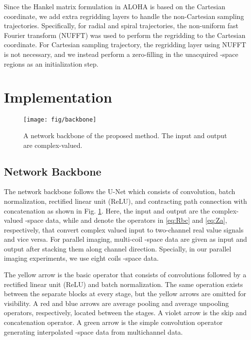 \documentclass[10pt,journal]{IEEEtran}
\newcommand{\0}{{\boldsymbol{0}}}
\begin{document}
Since the Hankel matrix formulation in ALOHA  is based on the Cartesian coordinate, we add extra regridding layers to handle the non-Cartesian sampling trajectories. 
Specifically, for radial and spiral trajectories, the non-uniform fast Fourier transform (NUFFT) was used to perform the regridding to the Cartesian coordinate. 
For Cartesian sampling trajectory, the regridding layer using NUFFT is  not necessary, and
we instead perform a zero-filling in the unacquired -space regions as an initialization step.



\section{Implementation}





\begin{figure}[!t] 	
\centering
{\texttt{[image: fig/backbone]}}
\caption{A network backbone of the proposed method. The input and output are complex-valued.}
\label{fig:backbone}
\end{figure}

\subsection{Network Backbone}

The network backbone  follows the  U-Net\cite{ronneberger2015u} which consists of convolution, batch normalization, rectified linear unit (ReLU), and contracting path connection with concatenation as shown in Fig. \ref{fig:backbone}.
Here, the input and output are the complex-valued -space data, while  and  denote the operators 
in \eqref{eq:Rbc} and \eqref{eq:Za}, respectively, that convert complex valued input to two-channel real value signals and vice versa.
For parallel imaging, 
multi-coil -space data are given as input and output after stacking them along channel direction. Specially,  in our parallel
imaging experiments, we use eight coils -space data.


The yellow arrow  is the basic operator that consists of  convolutions followed by a rectified linear unit (ReLU) and batch normalization.
The same operation exists  between the separate blocks at every stage, but
the yellow arrows are omitted for visibility.
A red and blue arrows are  average pooling and average unpooling operators, respectively, located between the stages.
A violet arrow is the skip and concatenation operator. A green arrow is the simple  convolution operator generating interpolated -space data from multichannel data.
\end{document}
